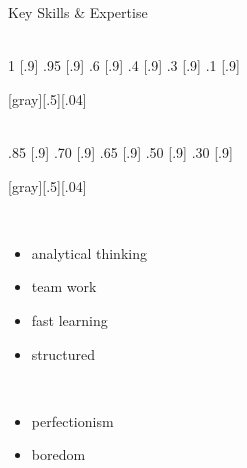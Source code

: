 \begin{frame}[t]{Key Skills \& Expertise}
%
  \vspace*{5mm}
  \begin{minipage}[c][.7\textheight][t]{.29\textwidth}\centering
    \\[2ex]
     {1}   [.9\textwidth]\sg
         {.95} [.9\textwidth]\sg
         {.6}  [.9\textwidth]\sg
         {.4}  [.9\textwidth]\sg
         {.3}  [.9\textwidth]\sg
         {.1}  [.9\textwidth]
  \end{minipage}[gray][.5][.04]
%
  \begin{minipage}[c][.7\textheight][t]{.3\textwidth}\centering
    \\[4.3ex]
              {.85} [.9\textwidth]\skg
               {.70} [.9\textwidth]\skg
                 {.65} [.9\textwidth]\skg
             {.50} [.9\textwidth]\skg
                  {.30} [.9\textwidth]
  \end{minipage}[gray][.5][.04]
%
  \begin{minipage}[c][.7\textheight][t]{.3\textwidth}\centering
    \\[2ex]
    \begin{itemize}\itemspace{2ex}
      \item analytical thinking
      \item team work
      \item fast learning
      \item structured\\[4ex]
    \end{itemize}
    \\[2ex]
    \begin{itemize}\itemspace{2ex}
      \item perfectionism
      \item boredom
    \end{itemize}
  \end{minipage}
%
\end{frame}
